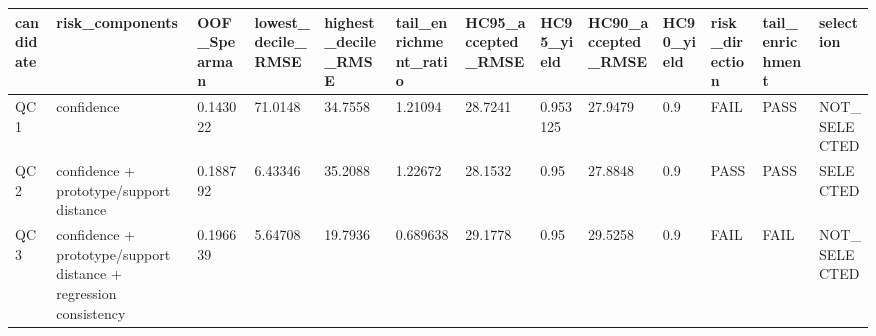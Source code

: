 \begin{tabular}{lllllllllllll}
\toprule
candidate & risk\_components & OOF\_Spearman & lowest\_decile\_RMSE & highest\_decile\_RMSE & tail\_enrichment\_ratio & HC95\_accepted\_RMSE & HC95\_yield & HC90\_accepted\_RMSE & HC90\_yield & risk\_direction & tail\_enrichment & selection \\ \midrule
QC1 & confidence & 0.143022 & 71.0148 & 34.7558 & 1.21094 & 28.7241 & 0.953125 & 27.9479 & 0.9 & FAIL & PASS & NOT\_SELECTED \\
QC2 & confidence + prototype/support distance & 0.188792 & 6.43346 & 35.2088 & 1.22672 & 28.1532 & 0.95 & 27.8848 & 0.9 & PASS & PASS & SELECTED \\
QC3 & confidence + prototype/support distance + regression consistency & 0.196639 & 5.64708 & 19.7936 & 0.689638 & 29.1778 & 0.95 & 29.5258 & 0.9 & FAIL & FAIL & NOT\_SELECTED \\
\bottomrule
\end{tabular}
